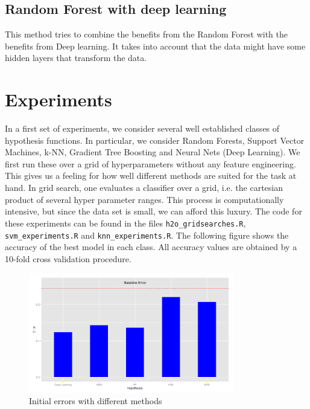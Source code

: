 \documentclass[paper=a4, fontsize=11pt]{scrartcl}
\numberwithin{equation}{section}
\numberwithin{figure}{section}
\numberwithin{table}{section}
\begin{document}
\subsection{Random Forest with deep learning}
This  method tries to combine the benefits from the Random Forest with the benefits from Deep learning. It takes into account that the data might have some hidden layers that transform the data. 









\section{Experiments}
In a first set of experiments, we consider several well established classes of hypothesis functions. In particular, we consider Random Forests, Support Vector Machines, k-NN,  Gradient Tree Boosting and Neural Nets (Deep Learning). 
We first run these over a grid of hyperparameters without any feature engineering. This gives us a feeling for how well different methods are suited for the task at hand. In grid search, one evaluates a classifier over a grid, i.e. the cartesian product of several hyper parameter ranges. This process is computationally intensive, but since the data set is small, we can afford this luxury. The code for these experiments can be found in the files \lstinline{h2o_gridsearches.R}, \lstinline{svm_experiments.R} and \lstinline{knn_experiments.R}. The following figure shows the accuracy of the best model in each class. All accuracy values are obtained by a 10-fold cross validation procedure. 

\begin{figure}[H]
    \centering
    \includegraphics[width=0.8\textwidth]{erorrs.png}
    \caption{Initial errors with different methods}
    \label{fig:errors}
\end{figure}
\end{document}
